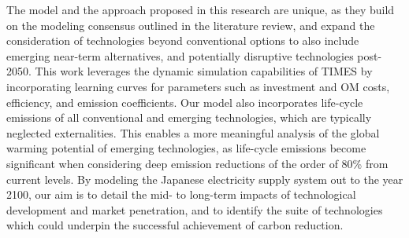 The model and the approach proposed in this research are unique, as they build on the modeling consensus outlined in the literature review, and expand the consideration of technologies beyond  conventional options to also include emerging near-term alternatives, and potentially disruptive technologies post-2050. This work leverages the dynamic simulation capabilities of \gls{TIMES} \cite{loulou_etsap-tiam_2008} by incorporating learning curves for parameters such as investment and \gls{OM} costs, efficiency, and emission coefficients. Our model also incorporates life-cycle emissions of all conventional and emerging technologies, which are typically neglected externalities. This enables a more meaningful analysis of the global warming potential of emerging technologies, as life-cycle emissions become significant when considering deep emission reductions of the order of 80\% from current levels. By modeling the Japanese electricity supply system out to the year 2100, our aim is to detail the mid- to long-term impacts of technological development and market penetration, and to identify the suite of technologies which could underpin the successful achievement of carbon reduction.

